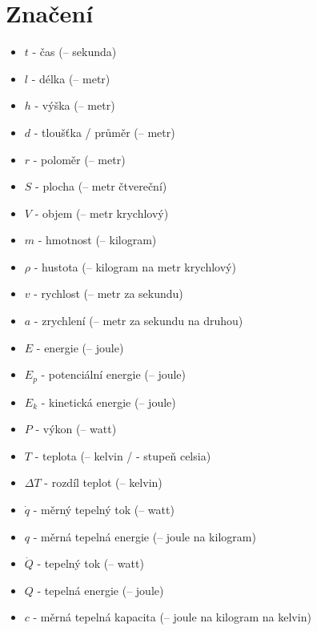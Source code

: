 \documentclass{article}
\begin{document}
\maketitle
\tableofcontents
\newpage



\section{Značení}

\begin{itemize}
    \item $t$ - čas (\ueqS \fs -- sekunda)
    \item $l$ - délka (\ueqM \fs -- metr)
    \item $h$ - výška (\ueqM \fs -- metr)
    \item $d$ - tloušťka / průměr (\ueqM \fs -- metr)
    \item $r$ - poloměr (\ueqM \fs -- metr)
    \item $S$ - plocha (\ueqMsq \fs -- metr čtvereční)
    \item $V$ - objem (\ueqMcu \fs -- metr krychlový)
    \item $m$ - hmotnost (\ueqKG \fs -- kilogram)
    \item $\rho$ - hustota (\ueqKGandMinvcu \fs -- kilogram na metr krychlový)
    \item $v$ - rychlost (\ueqMandSinv \fs -- metr za sekundu)
    \item $a$ - zrychlení (\ueqMandSinvsq \fs -- metr za sekundu na druhou)
    \item $E$ - energie (\ueqJ \fs -- joule)
    \item $E_p$ - potenciální energie (\ueqJ \fs -- joule)
    \item $E_k$ - kinetická energie (\ueqJ \fs -- joule)
    \item $P$ - výkon (\ueqW \fs -- watt)
    \item $T$ - teplota (\ueqK \fs -- kelvin / \ueqCELS \fs - stupeň celsia)
    \item $\Delta T$ - rozdíl teplot (\ueqK \fs -- kelvin)
    \item $\dot{q}$ - měrný tepelný tok (\ueqWandMinvsq \fs -- watt)
    \item $q$ - měrná tepelná energie (\ueqJandMinvsq \fs -- joule na kilogram)
    \item $\dot{Q}$ - tepelný tok (\ueqW \fs -- watt)
    \item $Q$ - tepelná energie (\ueqJ \fs -- joule)
    \item $c$ - měrná tepelná kapacita (\ueqJandKGinvKinv \fs -- joule na kilogram na kelvin)

\end{itemize}
\end{document}
